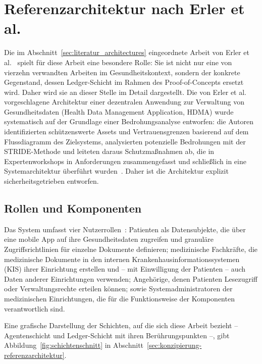 \section{Referenzarchitektur nach Erler et al.}
\label{sec:sota_referenzarchitektur}
Die im Abschnitt~\ref{sec:literatur_architectures} eingeordnete Arbeit von Erler et al.~\cite{erler2023} spielt für diese Arbeit eine besondere Rolle: Sie ist nicht nur eine von vierzehn verwandten Arbeiten im Gesundheitskontext, sondern der konkrete Gegenstand, dessen Ledger-Schicht im Rahmen des Proof-of-Concepts ersetzt wird. Daher wird sie an dieser Stelle im Detail dargestellt. Die von Erler et al. vorgeschlagene Architektur einer dezentralen Anwendung zur Verwaltung von Gesundheitsdaten (Health Data Management Application, HDMA) wurde systematisch auf der Grundlage einer Bedrohungsanalyse entworfen: die Autoren identifizierten schützenswerte Assets und Vertrauensgrenzen basierend auf dem Flussdiagramm des Zielsystems, analysierten potenzielle Bedrohungen mit der STRIDE-Methode und leiteten daraus Schutzmaßnahmen ab, die in Expertenworkshops in Anforderungen zusammengefasst und schließlich in eine Systemarchitektur überführt wurden~\cite{erler2023}. Daher ist die Architektur explizit sicherheitsgetrieben entworfen.

\subsection{Rollen und Komponenten}
Das System umfasst vier Nutzerrollen~\cite{erler2023}: Patienten als Datensubjekte, die über eine mobile App auf ihre Gesundheitsdaten zugreifen und granuläre Zugriffsrichtlinien für einzelne Dokumente definieren; medizinische Fachkräfte, die medizinische Dokumente in den internen Krankenhausinformationssystemen (KIS) ihrer Einrichtung erstellen und -- mit Einwilligung der Patienten -- auch Daten anderer Einrichtungen verwenden; Angehörige, denen Patienten Lesezugriff oder Verwaltungsrechte erteilen können; sowie Systemadministratoren der medizinischen Einrichtungen, die für die Funktionsweise der Komponenten verantwortlich sind.

Eine grafische Darstellung der Schichten, auf die sich diese Arbeit bezieht -- Agentenschicht und Ledger-Schicht mit ihren Berührungspunkten --, gibt Abbildung~\ref{fig:schichtenschnitt} in Abschnitt~\ref{sec:konzipierung-referenzarchitektur}.

